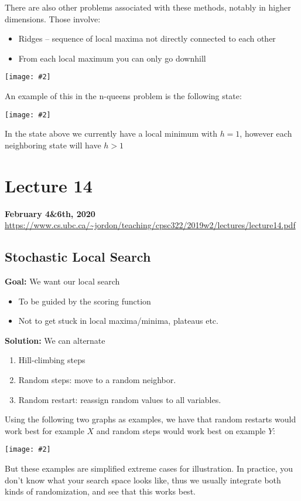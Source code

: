 \documentclass{article}
\newcommand{\centerfig}[2]{\begin{center}\texttt{[image: \#2]}\end{center}}
\begin{document}
There are also other problems associated with these methods, notably in higher dimensions. Those involve:
\begin{itemize}
	\item Ridges – sequence of local maxima not directly connected to each other
	\item From each local maximum you can only go downhill
\end{itemize}
\centerfig{0.8}{problems-2}

An example of this in the n-queens problem is the following state:
\centerfig{0.4}{problems-3}
In the state above we currently have a local minimum with $ h = 1 $, however each neighboring state will have $ h > 1 $
\newpage

\section*{Lecture 14}
\textbf{February 4\&6th, 2020} \\
\url{https://www.cs.ubc.ca/~jordon/teaching/cpsc322/2019w2/lectures/lecture14.pdf}

\subsection*{Stochastic Local Search}
\textbf{Goal:} We want our local search
\begin{itemize}
	\item To be guided by the scoring function
	\item Not to get stuck in local maxima/minima, plateaus etc.
\end{itemize} 
\textbf{Solution:} We can alternate
\begin{enumerate} [label = (\alph*)]
	\item Hill-climbing steps
	\item Random steps: move to a random neighbor.
	\item Random restart: reassign random values to all variables.
\end{enumerate}
Using the following two graphs as examples, we have that random restarts would work best for example $ X $ and random steps would work best on example $ Y $:
\centerfig{1}{random-steps}
But these examples are simplified extreme cases for illustration. In practice, you don’t know what your search space looks like, thus we usually integrate both kinds of randomization, and see that this works best.
\end{document}
